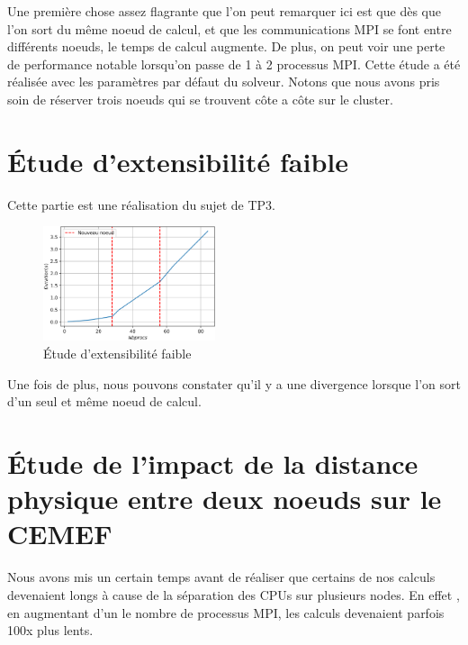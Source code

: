 \documentclass[10pt,twocolumn,letterpaper]{article}
\begin{document}
Une première chose assez flagrante que l'on peut remarquer ici est que dès que
l'on sort du même noeud de calcul, et que les communications MPI se font entre
différents noeuds, le temps de calcul augmente.
De plus, on peut voir une perte de performance notable lorsqu'on passe de 1 à 2
processus MPI. Cette étude a été réalisée avec les paramètres par défaut du
solveur.
Notons que nous avons pris soin de
réserver trois noeuds qui se trouvent côte a côte sur le cluster.

\section{Étude d'extensibilité faible}

Cette partie est une réalisation du sujet de TP3.

\begin{figure}[H]
    \centering
    \caption{Étude d'extensibilité faible}
    \includegraphics[width=0.45\textwidth]{fig/weak_scalab.png}
  \end{figure}


Une fois de plus, nous pouvons constater qu'il y a une divergence lorsque l'on
sort d'un seul et même noeud de calcul.

\section{Étude de l'impact de la distance physique entre deux
noeuds sur le CEMEF}

Nous avons mis un certain temps avant de réaliser que certains de nos calculs
devenaient longs à cause de la séparation des CPUs sur plusieurs nodes. En effet
, en augmentant d'un le nombre de processus MPI, les calculs devenaient parfois
100x plus lents.
\end{document}
